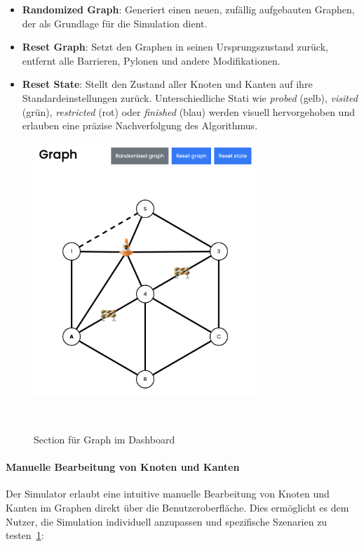\documentclass[main.tex]{subfiles} %
\begin{document}
\begin{itemize}
    \item \textbf{Randomized Graph}:  
    Generiert einen neuen, zufällig aufgebauten Graphen, der als Grundlage für die Simulation dient.

    \item \textbf{Reset Graph}:  
    Setzt den Graphen in seinen Ursprungszustand zurück, entfernt alle Barrieren, Pylonen und andere Modifikationen.

    \item \textbf{Reset State}:  
    Stellt den Zustand aller Knoten und Kanten auf ihre Standardeinstellungen zurück. Unterschiedliche Stati wie \emph{probed} (gelb), \emph{visited} (grün), \emph{restricted} (rot) oder \emph{finished} (blau) werden visuell hervorgehoben und erlauben eine präzise Nachverfolgung des Algorithmus.
\end{itemize}

\begin{figure}[H]
    \centering
    \includegraphics[width=0.75\textwidth]{./fig_Simulation/Graph.png}
    \caption{Section für Graph im Dashboard}~\label{fig:DashboardGraph}
\end{figure}

\paragraph{Manuelle Bearbeitung von Knoten und Kanten}

Der Simulator erlaubt eine intuitive manuelle Bearbeitung von Knoten und Kanten im Graphen direkt über die Benutzeroberfläche. Dies ermöglicht es dem Nutzer, die Simulation individuell anzupassen und spezifische Szenarien zu testen~\ref{fig:DashboardGraph}:
\end{document}
